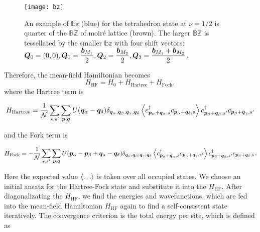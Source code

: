 \documentclass[aps,prl,floatfix,twocolumn]{revtex4-1}
\begin{document}
\begin{figure}[t]
	\centering
	\texttt{[image: bz]}
	\caption{An example of $ \mathbb{bz} $ (blue) for the tetrahedron state at $ \nu=1/2 $ is quarter of the $ \mathbb{BZ} $ of moir\'e lattice (brown). The larger $ \mathbb{BZ} $ is tessellated by the smaller $ \mathbb{bz} $ with four shift vectors: $ \bm{Q}_0=\qty(0,0),\bm{Q}_1=\dfrac{\bm{b}_{M_1}}{2},\bm{Q}_2=\dfrac{\bm{b}_{M_2}}{2},\bm{Q}_3=\dfrac{\bm{b}_{M_1}+\bm{b}_{M_2}}{2} $.}
	\label{fig:bz}
\end{figure}
Therefore, the mean-field Hamiltonian becomes
\begin{equation}
	H_{\text{HF}}= H_0+H_{\text{Hartree}}+H_{\text{Fock}},
\end{equation}
where the Hartree term is 
\begin{widetext}
	\begin{equation}\label{eq:hatree}
		H_{\text{Hartree}}=\frac{1}{\mathcal{N}} \sum_{s,s'} \sum_{{\bm{p},\bm{q}}}  U(\bm{q}_\alpha-\bm{q}_\delta) \delta_{\bm{q}_\alpha,\bm{q}_\beta,\bm{q}_\gamma,\bm{q}_\delta} \expval{c_{\bm{p}_\alpha+\bm{q}_\alpha,s}^\dagger c_{\bm{p}_\alpha+\bm{q}_\delta,s}} c_{\bm{p}_\beta+\bm{q}_\beta,s'}^\dagger c_{\bm{p}_\beta+\bm{q}_\gamma,s'}
	\end{equation}
\end{widetext}
and the Fork term is
\begin{widetext}
	\begin{equation}\label{eq:fock}
		H_{\text{Fock}}=-\frac{1}{\mathcal{N}}\sum_{s,s'} \sum_{{\bm{p},\bm{q}}} U(\bm{p}_\alpha-\bm{p}_\beta+\bm{q}_\alpha-\bm{q}_\delta)\delta_{\bm{q}_\alpha,\bm{q}_\beta,\bm{q}_\gamma,\bm{q}_\delta} \expval{c_{\bm{p}_\alpha+\bm{q}_\alpha,s}^\dagger c_{\bm{p}_\alpha+\bm{q}_\gamma,s'}} c_{\bm{p}_\beta+\bm{q}_\beta,s'}^\dagger c_{\bm{p}_\beta+\bm{q}_\delta,s}.
	\end{equation}	
\end{widetext}
Here the expected value $ \expval{\dots} $ is taken over all occupied states. We choose an initial ansatz for the Hartree-Fock state and substitute it into the $ H_{\text{HF}} $. After diagonalizating the $ H_{\text{HF}} $, we find the energies and wavefunctions, which are fed into the mean-field Hamiltonian $ H_{\text{HF}} $ again to find a self-consistent state iteratively. The convergence criterion is the total energy per site, which is defined as
\end{document}

